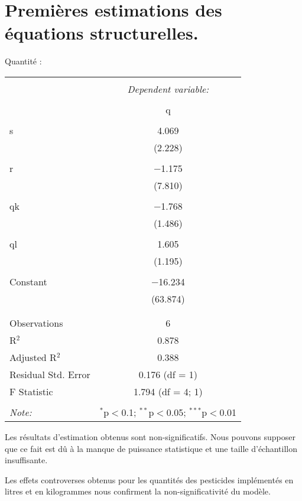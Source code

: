 \documentclass[11pt, a4paper]{article}
\begin{document}
\section*{Premières estimations des équations structurelles.}
\par
Quantité :
\FloatBarrier
\begin{center}
\begin{tabular}{@{\extracolsep{5pt}}lc} 
\\[-1.8ex]\hline 
\hline \\[-1.8ex] 
 & \multicolumn{1}{c}{\textit{Dependent variable:}} \\ 
\cline{2-2} 
\\[-1.8ex] & q \\ 
\hline \\[-1.8ex]
 s & 4.069 \\ 
  & (2.228) \\ 
  & \\ 
 r & $-$1.175 \\ 
  & (7.810) \\ 
  & \\
 qk & $-$1.768 \\ 
  & (1.486) \\ 
  & \\ 
 ql & 1.605 \\ 
  & (1.195) \\ 
  & \\
 Constant & $-$16.234 \\ 
  & (63.874) \\ 
  & \\ 
\hline \\[-1.8ex] 
Observations & 6 \\ 
R$^{2}$ & 0.878 \\ 
Adjusted R$^{2}$ & 0.388 \\ 
Residual Std. Error & 0.176 (df = 1) \\ 
F Statistic & 1.794 (df = 4; 1) \\ 
\hline 
\hline \\[-1.8ex] 
\textit{Note:}  & \multicolumn{1}{r}{$^{*}$p$<$0.1; $^{**}$p$<$0.05; $^{***}$p$<$0.01} 
\\
\end{tabular} 
\end{center}
\FloatBarrier
Les résultats d'estimation obtenus sont non-significatifs.
Nous pouvons supposer que ce fait est dû à la manque de puissance statistique et une taille d'échantillon insuffisante.
\par
Les effets controverses obtenus pour les quantités des pesticides implémentés en litres et en kilogrammes nous confirment la non-significativité du modèle.
\end{document}
